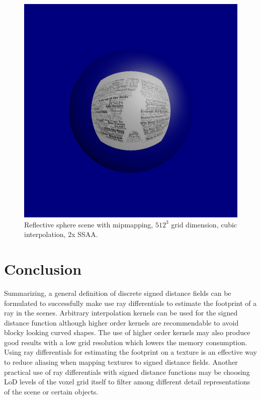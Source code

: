 \documentclass[12pt]{article}
\newcommand{\testhighres}{512}
\begin{document}
\begin{figure}[H]
	\centering
	\includegraphics[width=0.6\linewidth]{images/spere_mirror_high_lod_cubic_ssaa}
	\caption{Reflective sphere scene with mipmapping, $\testhighres^3$ grid dimension, cubic interpolation, 2x SSAA.}
	\label{fig:testssaa}
\end{figure}

\section{Conclusion}
Summarizing, a general definition of discrete signed distance fields can be formulated to successfully make use ray differentials to estimate the footprint of a ray in the scenes. Arbitrary interpolation kernels can be used for the signed distance function although higher order kernels are recommendable to avoid blocky looking curved shapes. The use of higher order kernels may also produce good results with a low grid resolution which lowers the memory consumption. Using ray differentials for estimating the footprint on a texture is an effective way to reduce aliasing when mapping textures to signed distance fields. Another practical use of ray differentials with signed distance functions may be choosing LoD levels of the voxel grid itself to filter among different detail representations of the scene or certain objects. 

%

\printbibliography 
\end{document}
